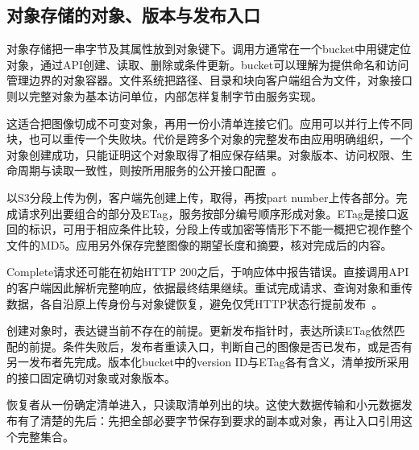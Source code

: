 \subsection{对象存储的对象、版本与发布入口}

对象存储把一串字节及其属性放到对象键下。调用方通常在一个bucket中用键定位对象，通过API创建、读取、删除或条件更新。bucket可以理解为提供命名和访问管理边界的对象容器。文件系统把路径、目录和块向客户端组合为文件，对象接口则以完整对象为基本访问单位，内部怎样复制字节由服务实现。

这适合把图像切成不可变对象，再用一份小清单连接它们。应用可以并行上传不同块，也可以重传一个失败块。代价是跨多个对象的完整发布由应用明确组织，一个对象创建成功，只能证明这个对象取得了相应保存结果。对象版本、访问权限、生命周期与读取一致性，则按所用服务的公开接口配置~\cite{s3-object-api}。

以S3分段上传为例，客户端先创建上传，取得，再按part number上传各部分。完成请求列出要组合的部分及ETag，服务按部分编号顺序形成对象。ETag是接口返回的标识，可用于相应条件比较，分段上传或加密等情形下不能一概把它视作整个文件的MD5。应用另外保存完整图像的期望长度和摘要，核对完成后的内容。

Complete请求还可能在初始HTTP 200之后，于响应体中报告错误。直接调用API的客户端因此解析完整响应，依据最终结果继续。重试完成请求、查询对象和重传数据，各自沿原上传身份与对象键恢复，避免仅凭HTTP状态行提前发布~\cite{s3-object-api}。

创建对象时，表达键当前不存在的前提。更新发布指针时，表达所读ETag依然匹配的前提。条件失败后，发布者重读入口，判断自己的图像是否已发布，或是否有另一发布者先完成。版本化bucket中的version ID与ETag各有含义，清单按所采用的接口固定确切对象或对象版本。


恢复者从一份确定清单进入，只读取清单列出的块。这使大数据传输和小元数据发布有了清楚的先后：先把全部必要字节保存到要求的副本或对象，再让入口引用这个完整集合。
\FloatBarrier
